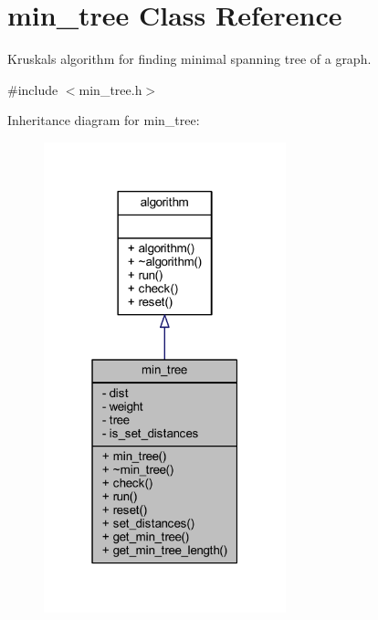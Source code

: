 \hypertarget{classmin__tree}{}\section{min\+\_\+tree Class Reference}
\label{classmin__tree}


Kruskal\textquotesingle{}s algorithm for finding minimal spanning tree of a graph.  




{\ttfamily \#include $<$min\+\_\+tree.\+h$>$}



Inheritance diagram for min\+\_\+tree\+:\nopagebreak
\begin{figure}[H]
\begin{center}
\leavevmode
\includegraphics[width=199pt]{classmin__tree__inherit__graph}
\end{center}
\end{figure}


